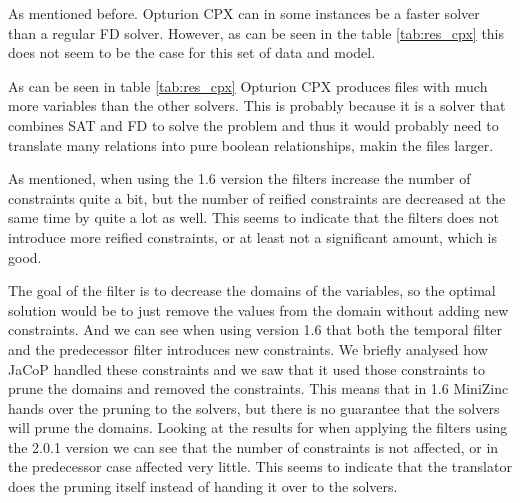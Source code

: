 As mentioned before. Opturion CPX can in some instances be a faster solver than a regular FD solver. However, as can be seen in the table \ref{tab:res_cpx} this does not seem to be the case for this set of data and model.

As can be seen in table \ref{tab:res_cpx} Opturion CPX produces files with much more variables than the other solvers. This is probably because it is a solver that combines SAT and FD to solve the problem and thus it would probably need to translate many relations into pure boolean relationships, makin the files larger.

As mentioned, when using the 1.6 version the filters increase the number of constraints quite a bit, but the number of reified constraints are decreased at the same time by quite a lot as well. This seems to indicate that the filters does not introduce more reified constraints, or at least not a significant amount, which is good.

The goal of the filter is to decrease the domains of the variables, so the optimal solution would be to just remove the values from the domain without adding new constraints. And we can see when using version 1.6 that both the temporal filter and the predecessor filter introduces new constraints. We briefly analysed how JaCoP handled these constraints and we saw that it used those constraints to prune the domains and removed the constraints. This means that in 1.6 MiniZinc hands over the pruning to the solvers, but there is no guarantee that the solvers will prune the domains. Looking at the results for when applying the filters using the 2.0.1 version we can see that the number of constraints is not affected, or in the predecessor case affected very little. This seems to indicate that the translator does the pruning itself instead of handing it over to the solvers.



